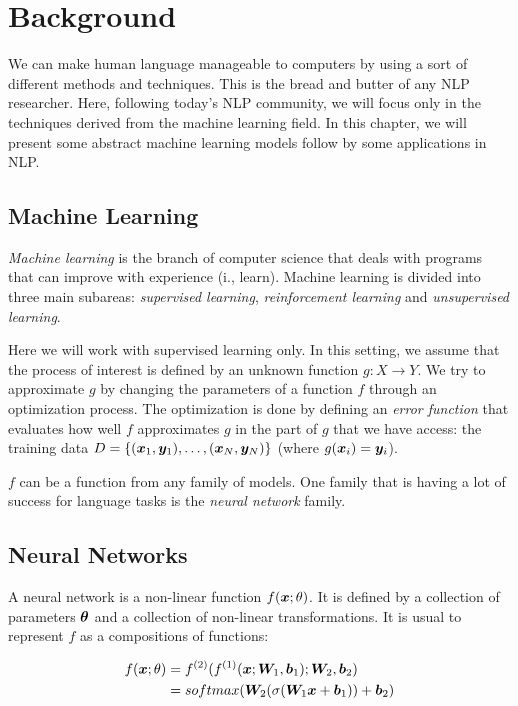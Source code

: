\chapter{Background}
\label{ch:02-background}

We can make human language manageable to computers by using a sort of different methods and techniques. This is the bread and butter of any NLP researcher. Here, following today's NLP community, we will focus only in the techniques derived from the machine learning field. In this chapter, we will present some abstract machine learning models follow by some applications in NLP. 

\section{Machine Learning}

\textit{Machine learning} is the branch of computer science that deals with programs that can improve with experience (i., learn). Machine learning is divided into three main subareas: \textit{supervised learning}, \textit{reinforcement learning} and \textit{unsupervised learning}.

Here we will work with supervised learning only. In this setting, we assume that the process of interest is defined by an unknown function $g:X\rightarrow Y$. We try to approximate $g$ by changing the parameters of a function $f$ through an optimization process. The optimization is done by defining an \textit{error function} that evaluates how well $f$ approximates $g$ in the part of $g$ that we have access: the training data $D = \{(\bm{x}_1, \bm{y}_1), \dots ,(\bm{x}_N, \bm{y}_N)\}$ (where $g(\bm{x}_i)=\bm{y}_i$).


$f$ can be a function from any family of models. One family that is having a lot of success for language tasks is the \textit{neural network} family.

\section{Neural Networks}

A neural network is a non-linear function $f(\bm{x}; \theta)$. It is defined by a collection of parameters $\bm{\theta}$ and a collection of non-linear transformations. It is usual to represent $f$ as a compositions of functions:

\begin{align}
f(\bm{x}; \theta) &= f^{(2)}(f^{(1)}(\bm{x}; \bm{W}_1, \bm{b}_1); \bm{W}_2, \bm{b}_2)\\
&= softmax(\bm{W}_2 (\sigma(\bm{W}_1\bm{x} + \bm{b}_1)) + \bm{b}_2)
\end{align}


